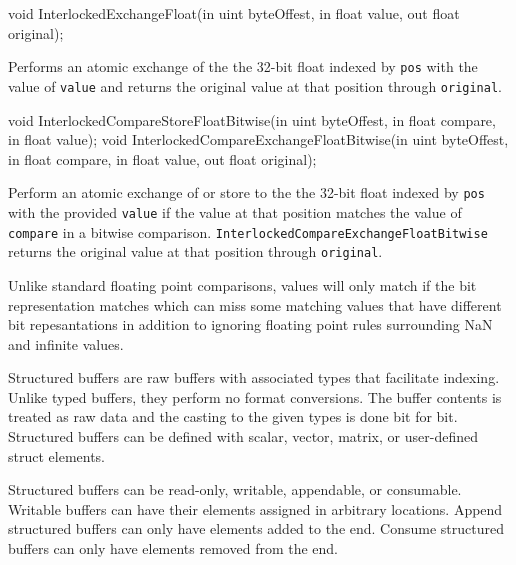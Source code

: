 \begin{HLSL}
   void InterlockedExchangeFloat(in uint byteOffest, in float value,
                                  out float original);
\end{HLSL}

Performs an atomic exchange of the the 32-bit float indexed by \texttt{pos} with
the value of \texttt{value} and returns the original value at that position through \texttt{original}.

\begin{HLSL}
  void InterlockedCompareStoreFloatBitwise(in uint byteOffest, in float compare,
                                            in float value);
  void InterlockedCompareExchangeFloatBitwise(in uint byteOffest,
                                               in float compare,
                                               in float value,
                                               out float original);
\end{HLSL}

Perform an atomic exchange of or store to the the 32-bit float indexed by
\texttt{pos} with the provided \texttt{value} if the value at that position
matches the value of \texttt{compare} in a bitwise comparison.
\texttt{InterlockedCompareExchangeFloatBitwise} returns the original value at
that position through \texttt{original}.

Unlike standard floating point comparisons, values will only match if the bit
representation matches which can miss some matching values that have different
bit repesantations in addition to ignoring floating point rules surrounding NaN
and infinite values.


Structured buffers are raw buffers with associated types that facilitate
indexing.
Unlike typed buffers, they perform no format conversions.
The buffer contents is treated as raw data and the casting to the given types
is done bit for bit.
Structured buffers can be defined with scalar, vector, matrix, or user-defined
struct elements.

Structured buffers can be read-only, writable, appendable, or consumable.
Writable buffers can have their elements assigned in arbitrary locations.
Append structured buffers can only have elements added to the end.
Consume structured buffers can only have elements removed from the end.

